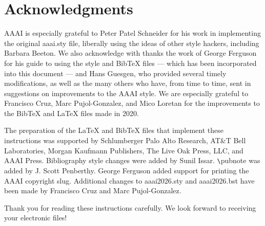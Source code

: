 \documentclass[letterpaper]{article} %
\begin{document}
\section{Acknowledgments}
AAAI is especially grateful to Peter Patel Schneider for his work in implementing the original aaai.sty file, liberally using the ideas of other style hackers, including Barbara Beeton. We also acknowledge with thanks the work of George Ferguson for his guide to using the style and BibTeX files --- which has been incorporated into this document --- and Hans Guesgen, who provided several timely modifications, as well as the many others who have, from time to time, sent in suggestions on improvements to the AAAI style. We are especially grateful to Francisco Cruz, Marc Pujol-Gonzalez, and Mico Loretan for the improvements to the Bib\TeX{} and \LaTeX{} files made in 2020.

The preparation of the \LaTeX{} and Bib\TeX{} files that implement these instructions was supported by Schlumberger Palo Alto Research, AT\&T Bell Laboratories, Morgan Kaufmann Publishers, The Live Oak Press, LLC, and AAAI Press. Bibliography style changes were added by Sunil Issar. \verb+\+pubnote was added by J. Scott Penberthy. George Ferguson added support for printing the AAAI copyright slug. Additional changes to aaai2026.sty and aaai2026.bst have been made by Francisco Cruz and Marc Pujol-Gonzalez.

\bigskip
\noindent Thank you for reading these instructions carefully. We look forward to receiving your electronic files!


\end{document}
